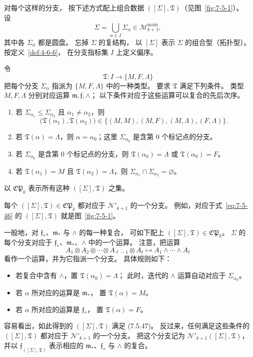 对每个这样的分支，
按下述方式配上组合数据
$([\Sigma],\mathfrak T)$（见图~\ref{fig:7-5-1}）。
设
\[
\Sigma=\bigcup_{\alpha\in I}\Sigma_\alpha
\in\mathcal M_{k+1}^{\mathrm{main}},
\]
其中各 $\Sigma_\alpha$ 都是圆盘。
忘掉 $\Sigma$ 的复结构，
以 $[\Sigma]$ 表示 $\Sigma$ 的组合型（拓扑型）。
按定义~\ref{def:4-6-6}，
在分支指标集 $I$ 上定义偏序。

令
\[
\mathfrak T\colon I\longrightarrow\{M,F,\Lambda\}
\]
把每个分支 $\Sigma_\alpha$ 指派为
$\{M,F,\Lambda\}$ 中的一种类型。
要求 $\mathfrak T$ 满足下列条件。
类型 $M,F,\Lambda$ 分别对应运算
$\mathfrak m,\mathfrak f,\wedge$；
以下条件对应于这些运算可以复合的先后次序。
\begin{enumerate}[label=\textup{(7.5.47.\arabic*)},leftmargin=6em]
\item\label{eq:7-5-47-1}
若 $\Sigma_{\alpha_1}\leq\Sigma_{\alpha_2}$ 且
$\alpha_1\neq\alpha_2$，则
\[
\bigl(\mathfrak T(\alpha_1),\mathfrak T(\alpha_2)\bigr)
\in\{(M,M),(M,F),(M,\Lambda),(F,\Lambda)\}.
\]
\item\label{eq:7-5-47-2}
若 $\mathfrak T(\alpha)=\Lambda$，则
$\alpha=\alpha_0$；这里 $\Sigma_{\alpha_0}$
是含第 $0$ 个标记点的分支。
\item\label{eq:7-5-47-3}
若 $\Sigma_{\alpha_0}$ 是含第 $0$ 个标记点的分支，则
$\mathfrak T(\alpha_0)=\Lambda$ 或
$\mathfrak T(\alpha_0)=F$。
\item\label{eq:7-5-47-4}
若 $\mathfrak T(\alpha_1)=M$ 且
$\mathfrak T(\alpha_2)=\Lambda$，则
$\Sigma_{\alpha_1}\cap\Sigma_{\alpha_2}=\varnothing$。
\end{enumerate}
以 $\mathfrak{CP}_k$ 表示所有这种
$([\Sigma],\mathfrak T)$ 之集。

每个
$([\Sigma],\mathfrak T)\in\mathfrak{CP}_k$
都对应于 $\mathcal N'_{k+1}$ 的一个分支。
例如，对应于式~\eqref{eq:7-5-46} 的
$([\Sigma],\mathfrak T)$ 就是图~\ref{fig:7-5-1}。

一般地，对 $\mathfrak f_*$、$\mathfrak m_*$
与 $\wedge$ 的每一种复合，
可如下配上
$([\Sigma],\mathfrak T)\in\mathfrak{CP}_k$。
$\Sigma$ 的每个分支对应于
$\mathfrak f_*$、$\mathfrak m_*$、$\wedge$
中的一个运算。
注意，把运算
\[
A_1\otimes A_2\otimes\cdots\otimes A_{\ell-1}
\otimes A_\ell
\longmapsto A_1\wedge\cdots\wedge A_\ell
\]
看作一个运算，并为它指派一个分支。
具体规则如下：
\begin{itemize}[leftmargin=2.2em]
\item 若复合中含有 $\wedge$，置
$\mathfrak T(\alpha_0)=\Lambda$；
此时，迭代的 $\wedge$ 运算自动对应于
$\Sigma_{\alpha_0}$。
\item 若 $\alpha$ 所对应的运算是 $\mathfrak m_*$，
置 $\mathfrak T(\alpha)=M$。
\item 若 $\alpha$ 所对应的运算是 $\mathfrak f_*$，
置 $\mathfrak T(\alpha)=F$。
\end{itemize}
容易看出，如此得到的
$([\Sigma],\mathfrak T)$ 满足 (7.5.47)。
反过来，任何满足这些条件的
$([\Sigma],\mathfrak T)$ 都对应于
$\mathcal N'_{k+1}$ 的一个分支。
把这个分支记为
$\mathcal N'_{k+1}([\Sigma],\mathfrak T)$，
并以 $\mathfrak f_{([\Sigma],\mathfrak T)}$
表示相应的
$\mathfrak m_*$、$\mathfrak f_*$ 与 $\wedge$ 的复合。

